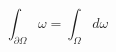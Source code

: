     \begin{center}
        \begin{equation*}
            \int_{\partial{\Omega}} \omega = \int_{\Omega} d\omega
        \end{equation*}
    \end{center}
